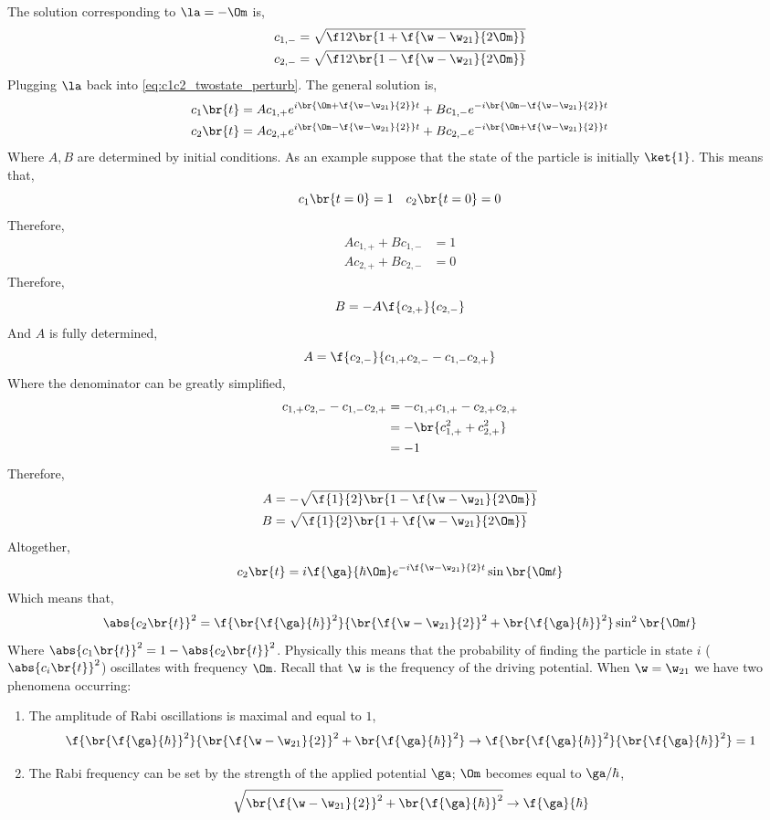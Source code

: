 \documentclass{article}
\begin{document}
The solution corresponding to $\la = - \Om$ is,
\begin{align*}
c_{1,-} = \sqrt{\f12 \br{1 + \f{\w - \w_{21}}{2 \Om}}} \\
c_{2,-} = \sqrt{\f12 \br{1 - \f{\w - \w_{21}}{2 \Om}}}
\end{align*}
Plugging $\la$ back into \cref{eq:c1c2_twostate_perturb}. The general solution is,
\begin{align*}
c_1\br{t} &= A c_{1,+} e^{i \br{\Om + \f{\w - \w_{21}}{2}} t} + B c_{1,-} e^{-i \br{\Om - \f{\w - \w_{21}}{2}} t} \\
c_2\br{t} &= A c_{2,+} e^{i \br{\Om - \f{\w - \w_{21}}{2}} t} + B c_{2,-} e^{-i \br{\Om + \f{\w - \w_{21}}{2}} t}
\end{align*}
Where $A, B$ are determined by initial conditions. As an example suppose that the state of the particle is initially $\ket{1}$. This means that,
\[  c_1\br{t=0} = 1 \quad c_2\br{t = 0} = 0 \]
Therefore,
\begin{align*}
    Ac_{1, +} + Bc_{1, -} &= 1 \\
    Ac_{2, +} + Bc_{2, -} &= 0
\end{align*}
Therefore,
\[ B = - A\f{c_{2, +}}{c_{2, -}} \]
And $A$ is fully determined,
\[ A = \f{c_{2, -}}{c_{1, +}c_{2, -} - c_{1, -}c_{2, +}} \]
Where the denominator can be greatly simplified,
\begin{align*}
    c_{1, +}c_{2, -} - c_{1, -}c_{2, +}
    &= -c_{1, +}c_{1, +} - c_{2, +}c_{2, +} \\
    &= -\br{c^2_{1, +} + c^2_{2, +}} \\
    &= -1
\end{align*}
Therefore,
\begin{align*}
    A &= - \sqrt{\f{1}{2}\br{1 - \f{\w -\w_{21}}{2\Om}}} \\
    B &= \sqrt{\f{1}{2}\br{1 + \f{\w -\w_{21}}{2\Om}}}
\end{align*}
Altogether,
\[ c_2\br{t} = i \f{\ga}{\hbar\Om} e^{-i \f{\w - \w_{21}}{2} t} \sin\br{\Om t}\]
Which means that,
\[ \abs{c_2\br{t}}^2 = \f{\br{\f{\ga}{\hbar}}^2}{\br{\f{\w - \w_{21}}{2}}^2 + \br{\f{\ga}{\hbar}}^2} \sin^2\br{\Om t} \]
Where $\abs{c_1\br{t}}^2 = 1 - \abs{c_2\br{t}}^2$. Physically this means that the probability of finding the particle in state $i$ ($\abs{c_i \br{t}}^2$) oscillates with frequency $\Om$. Recall that $\w$ is the frequency of the driving potential. When $\w = \w_{21}$ we have two phenomena occurring:
\begin{enumerate}
    \item The amplitude of Rabi oscillations is maximal and equal to $1$,
    \[ \f{\br{\f{\ga}{\hbar}}^2}{\br{\f{\w - \w_{21}}{2}}^2 + \br{\f{\ga}{\hbar}}^2} \to \f{\br{\f{\ga}{\hbar}}^2}{\br{\f{\ga}{\hbar}}^2} = 1\]
    \item The Rabi frequency can be set by the strength of the applied potential $\ga$; $\Om$ becomes equal to $\ga/\hbar$,
    \[ \sqrt{\br{\f{\w - \w_{21}}{2}}^2 + \br{\f{\ga}{\hbar}}^2} \to \f{\ga}{\hbar} \]
\end{enumerate}
\end{document}
